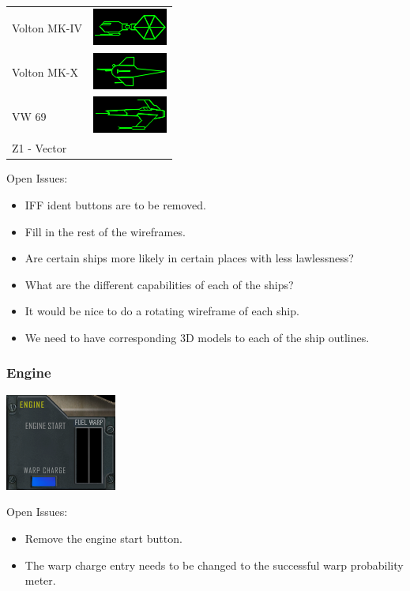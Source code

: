 \begin{tabular}{ | l | l | }
Volton MK-IV & \includegraphics[scale=0.75]{images/ship_Voton_MK_IV.png} \\
Volton MK-X & \includegraphics[scale=0.75]{images/ship_Voton_MK_X.png} \\
VW 69 & \includegraphics[scale=0.75]{images/ship_VW-69.png} \\
Z1 - Vector & \\
\hline
\end{tabular}

Open Issues:
\begin{itemize}
\item IFF ident buttons are to be removed.
\item Fill in the rest of the wireframes.
\item Are certain ships more likely in certain places with less lawlessness?
\item What are the different capabilities of each of the ships?
\item It would be nice to do a rotating wireframe of each ship.
\item We need to have corresponding 3D models to each of the ship outlines.
\end{itemize}

\subsubsection{Engine}
\includegraphics[scale=0.70]{images/engine.png}

Open Issues:
\begin{itemize}
\item Remove the engine start button.
\item The warp charge entry needs to be changed to the successful warp
probability meter.
\end{itemize}

